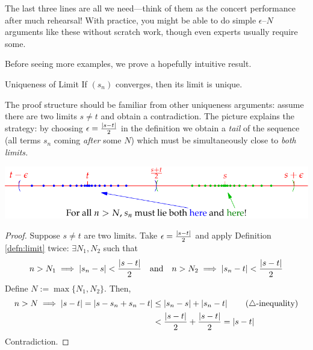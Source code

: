
\goodbreak




The last three lines are all we need---think of them as the concert performance after much rehearsal! With practice, you might be able to do simple $\epsilon$--$N$ arguments like these without scratch work, though even experts usually require some.\smallbreak

Before seeing more examples, we prove a hopefully intuitive result.

\begin{lemm}{Uniqueness of Limit}{}
If $(s_n)$ converges, then its limit is unique.
\end{lemm}

The proof structure should be familiar from other uniqueness arguments: assume there are two limits $s\neq t$ and obtain a contradiction. The picture explains the strategy: by choosing $\epsilon=\frac{\left| s-t\right|}2$ in the definition we obtain a \emph{tail} of the sequence (all terms $s_n$ coming \emph{after} some $N$) which must be simultaneously close to \emph{both limits.}
\begin{center}
\includegraphics{limitunique}
\end{center}

\begin{proof}
Suppose $s\neq t$ are two limits. Take $\epsilon=\frac{\left| s-t\right|}2$ and apply Definition \ref{defn:limit} twice: $\exists N_1,N_2$ such that
\[n>N_1\implies \left| s_n-s\right|<\frac{\left| s-t\right|}2\quad \text{and}\quad n>N_2\implies \left| s_n-t\right|<\frac{\left| s-t\right|}2\]
Define $N:=\max\{N_1,N_2\}$. Then,
\begin{align*}
n>N\implies\left| s-t\right|=\left| s-s_n+s_n-t\right|&\le\left| s_n-s\right|+\left| s_n-t\right| \tag*{($\triangle$-inequality)}\\
&<\frac{\left| s-t\right|}2+\frac{\left| s-t\right|}2 =\left| s-t\right|
\end{align*}
Contradiction.
\end{proof}


